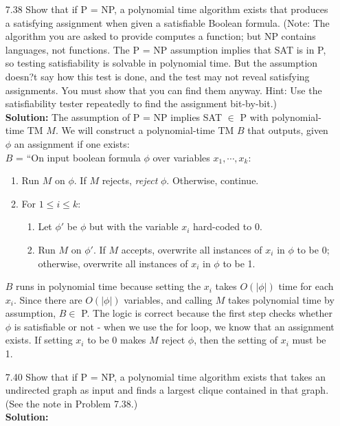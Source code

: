 \begin{enumerate}
\item[7.38]Show that if P = NP, a polynomial time algorithm exists that produces a satisfying assignment when given a satisfiable Boolean formula. (Note: The algorithm you are asked to provide computes a function; but NP contains languages, not functions. The P = NP assumption implies that SAT is in P, so testing satisfiability is solvable in polynomial time. But the assumption doesn?t say how this test is done, and the test may not reveal satisfying assignments. You must show that you can find them anyway. Hint: Use the satisfiability tester repeatedly to find the assignment bit-by-bit.)
\\
\textbf{Solution:} The assumption of P = NP implies SAT $\in$ P with polynomial-time TM $M$. We will construct a polynomial-time TM $B$ that outputs, given $\phi$ an assignment if one exists:
\\
$B$ = ``On input boolean formula $\phi$ over variables $x_1, \cdots, x_k$:
\begin{enumerate}
\item Run $M$ on $\phi$. If $M$ rejects, \emph{reject} $\phi$. Otherwise, continue.
\item For $1 \le i \le k$:
\begin{enumerate}
\item Let $\phi'$ be $\phi$ but with the variable $x_i$ hard-coded to 0. 
\item Run $M$ on $\phi'$. If $M$ accepts, overwrite all instances of $x_i$ in $\phi$ to be 0; otherwise, overwrite all instances of $x_i$ in $\phi$ to be 1.
\end{enumerate}
\end{enumerate}
$B$ runs in polynomial time because setting the $x_i$ takes $O(|\phi|)$ time for each $x_i$. Since there are $O(|\phi|)$ variables, and calling $M$ takes polynomial time by assumption, $B \in$ P. The logic is correct because the first step checks whether $\phi$ is satisfiable or not - when we use the for loop, we know that an assignment exists. If setting $x_i$ to be 0 makes $M$ reject $\phi$, then the setting of $x_i$ must be 1.

\item[7.40]Show that if P = NP, a polynomial time algorithm exists that takes an undirected graph as input and finds a largest clique contained in that graph. (See the note in Problem 7.38.)
\\
\textbf{Solution:} \alreadyanswered


\end{enumerate}
